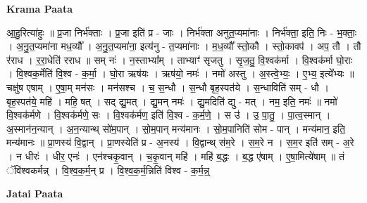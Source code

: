 \documentclass[17pt]{extarticle}
\begin{document}
\textbf{Krama Paata} \newline

आ॒हु॒रित्या॑हुः ॥ प्र॒जा निर्भ॑क्ताः । प्र॒जा इति॑ प्र - जाः । निर्भ॑क्ता अनुत॒प्यमा॑नाः । निर्भ॑क्ता॒ इति॒ निः - भ॒क्ताः॒ । अ॒नु॒त॒प्यमा॑ना मध॒व्यौ᳚ । अ॒नु॒त॒प्यमा॑ना॒ इत्य॑नु - त॒प्यमा॑नाः । म॒ध॒व्यौ᳚ स्तो॒कौ । स्तो॒कावप॑ । अप॒ तौ । तौ र॑राध । र॒रा॒धेति॑ रराध ॥ सम् नः॑ । न॒स्ताभ्या᳚म् । ताभ्याꣳ॑ सृजतु । सृ॒ज॒तु॒ वि॒श्वक॑र्मा । वि॒श्वक॑र्मा घो॒राः । वि॒श्वक॒र्मेति॑ वि॒श्व - क॒र्मा॒ । घो॒रा ऋष॑यः । ऋष॑यो॒ नमः॑ । नमो॑ अस्तु । अ॒स्त्वे॒भ्यः॒ । ए॒भ्य॒ इत्ये᳚भ्यः ॥ चक्षु॑ष एषाम् । ए॒षा॒म् मन॑सः । मन॑सश्च । च॒ स॒न्धौ । स॒न्धौ बृह॒स्पत॑ये । स॒न्धाविति॑ सम् - धौ । बृह॒स्पत॑ये॒ महि॑ । महि॒ षत् । सद् द्यु॒मत् । द्यु॒मन् नमः॑ । द्यु॒मदिति॑ द्यु - मत् । नम॒ इति॒ नमः॑ ॥ नमो॑ वि॒श्वक॑र्मणे । वि॒श्वक॑र्मणे॒ सः । वि॒श्वक॑र्मण॒ इति॑ वि॒श्व - क॒र्म॒णे॒ । स उ॑ । उ॒ पा॒तु॒ । पा॒त्व॒स्मान् । अ॒स्मान॑न॒न्यान् । अ॒न॒न्यान्थ् सो॑म॒पान् । सो॒म॒पान् मन्य॑मानः । सो॒म॒पानिति॑ सोम - पान् । मन्य॑मान॒ इति॒ मन्य॑मानः ॥ प्रा॒णस्य॑ वि॒द्वान् । प्रा॒णस्येति॑ प्र - अ॒नस्य॑ । वि॒द्वान्थ् स॑म॒रे । स॒म॒रे न । स॒म॒र इति॑ सम् - अ॒रे । न धीरः॑ । धीर॒ एनः॑ । एन॑श्चकृ॒वान् । च॒कृ॒वान् महि॑ । महि॑ ब॒द्धः । ब॒द्ध ए॑षाम् । ए॒षा॒मित्ये॑षाम् ॥ तं ॅवि॑श्वकर्मन्न् । वि॒श्व॒क॒र्म॒न् प्र । वि॒श्व॒क॒र्म॒न्निति॑ विश्व - क॒र्म॒न्न्॒ \newline

\textbf{Jatai Paata} \newline
\end{document}
